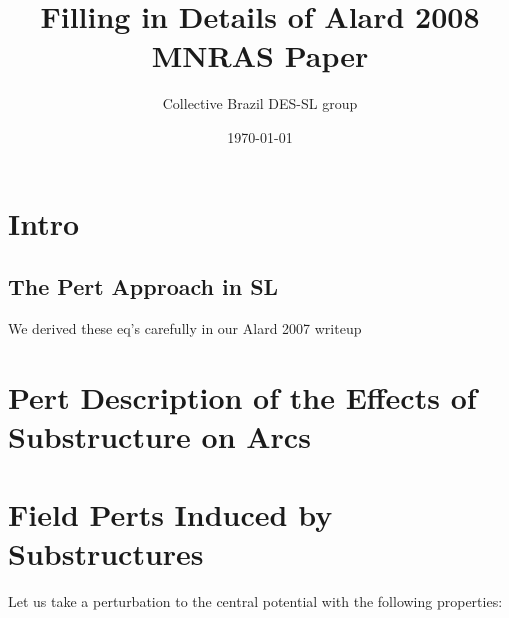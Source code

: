 \documentclass[a4paper,twoside]{article}
\begin{document}
\title{Filling in Details of Alard 2008 MNRAS Paper}
%
\author{Collective Brazil DES-SL group}


\date{\today}
\maketitle

\section{Intro}
\subsection{The Pert Approach in SL}

We derived these eq's carefully in our Alard 2007 writeup

\section{Pert Description of the Effects of Substructure on Arcs}

\section{Field Perts Induced by Substructures}

Let us take a perturbation to the central potential with the following properties:
\end{document}
